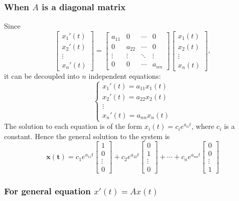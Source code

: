 \documentclass[10pt, a4paper]{article}
\newcommand{\vt}[1]{\mathbf{#1}}
\begin{document}
\subsubsection*{When $A$ is a diagonal matrix}
\indent Since \[
\begin{bmatrix}
    x_1'(t)\\
    x_2'(t)\\
    \vdots\\
    x_n'(t)
\end{bmatrix}
= \begin{bmatrix}
    a_{11}&0&\cdots&0\\
    0&a_{22}&\cdots&0\\
    \vdots&\vdots&\ddots&\vdots\\
    0&0&\cdots&a_{nn}
\end{bmatrix}
\begin{bmatrix}
    x_1(t)\\
    x_2(t)\\
    \vdots\\
    x_n(t)
\end{bmatrix},
\]
it can be decoupled into $n$ independent equations:\[
\begin{cases}
    x_1'(t) = a_{11} x_1(t)\\
    x_2'(t) = a_{22} x_2(t)\\
    \vdots\\
    x_n'(t) = a_{nn} x_n(t)
\end{cases}
\]
The solution to each equation is of the form $x_i(t)=c_i e^{a_{ii}t}$, where $c_i$ is a constant. Hence the general solution to the system is \[
\vt{x(t)} = c_1 e^{a_{11}t}\begin{bmatrix}
    1\\
    0\\
    \vdots\\
    0
\end{bmatrix} + c_2 e^{a_{22}t}\begin{bmatrix}
    0\\
    1\\
    \vdots\\
    0
\end{bmatrix} + \cdots + c_n e^{a_{nn}t}\begin{bmatrix}
    0\\
    0\\
    \vdots\\
    1
\end{bmatrix}
\]

\subsubsection*{For general equation $x'(t)=Ax(t)$}
\end{document}
